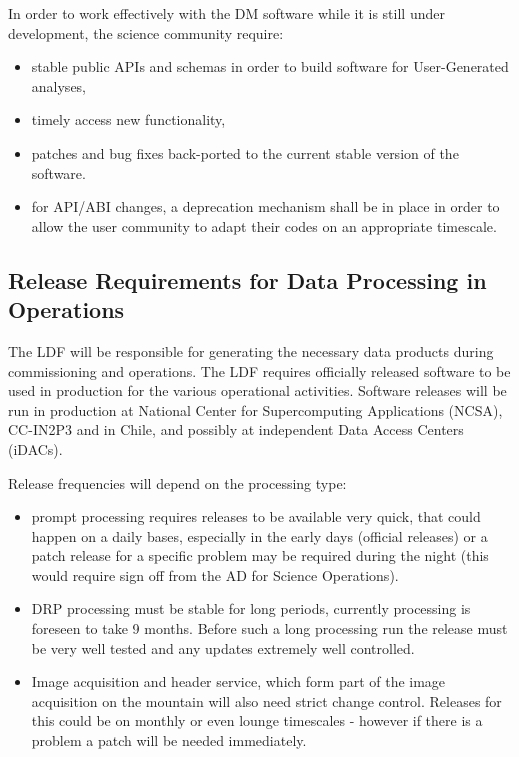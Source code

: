 In order to work effectively with the \gls{DM} software while it is still under development, the science community require: 
\begin{itemize}
\item stable public APIs and schemas in order to build software for User-Generated analyses, 
\item timely access new functionality,  
\item patches and bug fixes back-ported to the current stable version of the software. 
\item for API/ABI changes, a deprecation mechanism shall be in place in order to allow the user community to adapt their codes on an appropriate timescale.
\end{itemize}


\subsection{Release Requirements for Data Processing in Operations} \label{sec:procreqs}

The \gls{LDF} will be responsible for generating the necessary data products during commissioning and operations. 
The \gls{LDF} requires officially released software to be used in production for the various operational activities.
Software releases will be run in production at National \gls{Center} for Supercomputing Applications (\gls{NCSA}), CC-IN2P3 and in Chile, and possibly at independent Data Access Centers (iDACs).

Release frequencies will depend on the processing type:
\begin{itemize}
\item prompt processing requires releases to be available very quick, that could happen on a daily bases, especially in the early days (official releases)
 or a  patch release  for a specific problem may be required during the night (this would require sign off from the \gls{AD} for Science \gls{Operations}).
\item \gls{DRP} processing  must be stable for long periods, currently processing is foreseen to take 9 months.  Before such a long processing run the release must be very well tested and any updates extremely well controlled.
\item Image acquisition and header service, which form part of the image acquisition on the mountain will also need strict change control. Releases for this could be on monthly or even lounge timescales - however if there is a problem a patch will be needed immediately.
\end{itemize}

